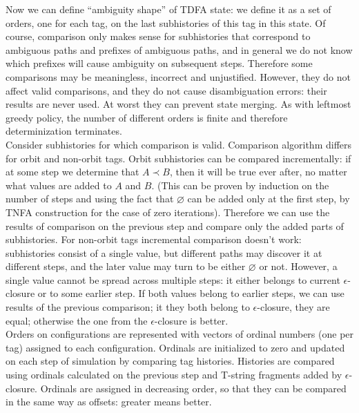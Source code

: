 \documentclass{article}
\theoremstyle{definition}
\begin{document}
\begin{multicols}{2}
Now we can define ``ambiguity shape'' of TDFA state:
we define it as a set of orders, one for each tag, on the last subhistories of this tag in this state.
Of course, comparison only makes sense for subhistories that correspond to ambiguous paths and prefixes of ambiguous paths,
and in general we do not know which prefixes will cause ambiguity on subsequent steps.
Therefore some comparisons may be meaningless, incorrect and unjustified.
However, they do not affect valid comparisons,
and they do not cause disambiguation errors: their results are never used.
At worst they can prevent state merging.
As with leftmost greedy policy, the number of different orders is finite
and therefore determinization terminates.
\\

Consider subhistories for which comparison is valid.
Comparison algorithm differs for orbit and non-orbit tags.
Orbit subhistories can be compared incrementally:
if at some step we determine that $A \prec B$, then it will be true ever after, no matter what values are added to $A$ and $B$.
(This can be proven by induction on the number of steps
and using the fact that $\varnothing$ can be added only at the first step,
by TNFA construction for the case of zero iterations).
Therefore we can use the results of comparison on the previous step and compare only the added parts of subhistories.
For non-orbit tags incremental comparison doesn't work:
subhistories consist of a single value, but different paths may discover it at different steps,
and the later value may turn to be either $\varnothing$ or not.
However, a single value cannot be spread across multiple steps:
it either belongs to current $\epsilon$-closure or to some earlier step.
If both values belong to earlier steps, we can use results of the previous comparison;
it they both belong to $\epsilon$-closure, they are equal;
otherwise the one from the $\epsilon$-closure is better.
\\

Orders on configurations are represented with vectors of ordinal numbers (one per tag) assigned to each configuration.
Ordinals are initialized to zero and updated on each step of simulation by comparing tag histories.
Histories are compared using ordinals calculated on the previous step and T-string fragments added by $\epsilon$-closure.
Ordinals are assigned in decreasing order, so that they can be compared in the same way as offsets: greater means better.
\\


\end{multicols}
\end{document}

